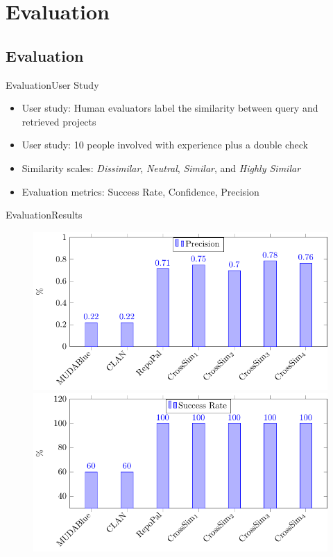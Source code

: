\documentclass{beamer}
\begin{document}
\section{Evaluation}
\subsection{Evaluation}

\begin{frame}{Evaluation}{User Study}
	\begin{itemize}
	\item User study: Human evaluators label the similarity between query and retrieved projects
	\item User study: 10 people involved with experience plus a double check
	\item Similarity scales: \emph{Dissimilar}, \emph{Neutral}, \emph{Similar}, and \emph{Highly Similar}
	\item Evaluation metrics: Success Rate, Confidence, Precision
	\end{itemize}
\end{frame}

\begin{frame}{Evaluation}{Results}
\begin{figure}[!tbp]
  \centering
  \begin{minipage}[b]{0.45\textwidth}
    \includegraphics[width=\textwidth]{images/Precision.pdf}
  \end{minipage}
  \hfill
  \begin{minipage}[b]{0.45\textwidth}
    \includegraphics[width=\textwidth]{images/SuccessRate.pdf}
  \end{minipage}
\end{figure}
\end{frame}
\end{document}
